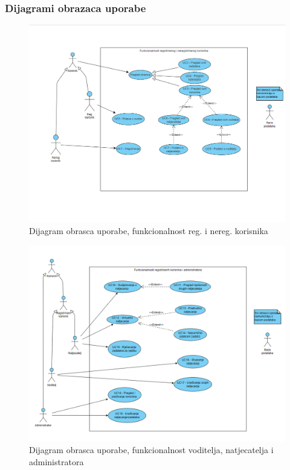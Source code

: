 				
					
				\subsubsection{Dijagrami obrazaca uporabe}				
					
						\begin{figure}[H]
						\includegraphics[scale=0.4]{slike/Uml - obrasci uporabe 1}
						\centering
						\caption{Dijagram obrasca uporabe, funkcionalnost reg. i nereg. korisnika}
						\label{fig:dijagram1}
					\end{figure}
					
					\begin{figure}[H]
						\includegraphics[scale=0.4]{slike/Uml - obrasci uporabe 2}
						\centering
						\caption{Dijagram obrasca uporabe, funkcionalnost voditelja, natjecatelja i administratora}
						\label{fig:dijagram2}
					\end{figure}
					
